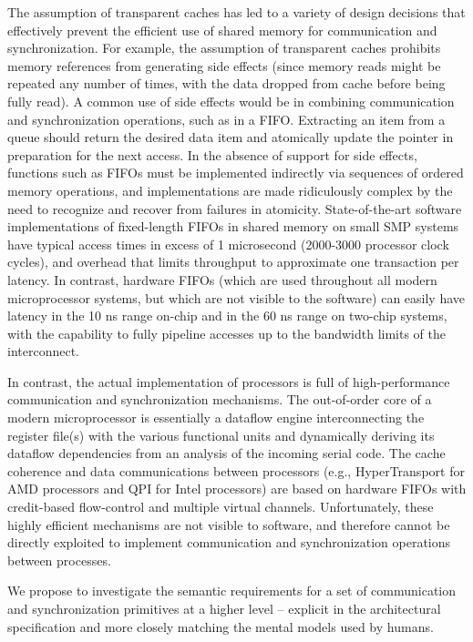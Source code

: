 The assumption of transparent caches has led to a variety of design decisions
that effectively prevent the efficient use of shared memory for communication and
synchronization.  For example, the assumption of transparent caches prohibits
memory references from generating side effects (since memory reads might be
repeated any number of times, with the data dropped from cache before being
fully read).  A common use of side effects would be in combining communication
and synchronization operations, such as in a FIFO.   Extracting an item from a 
queue should return the desired data item and atomically update the pointer
in preparation for the next access.  In the absence of support for side effects, 
functions such as FIFOs must be implemented indirectly via sequences of 
ordered memory operations, and implementations are made ridiculously 
complex by the need to recognize and recover from failures in atomicity.
State-of-the-art software implementations of fixed-length FIFOs in shared 
memory on small SMP systems have typical access times in excess of 
1 microsecond (2000-3000 processor clock cycles), and overhead that limits
throughput to approximate one transaction per latency.  In contrast, hardware
FIFOs (which are used throughout all modern microprocessor systems, but
which are not visible to the software) can easily have latency in the 10 ns 
range on-chip and in the 60 ns range on two-chip systems, with the capability
to fully pipeline accesses up to the bandwidth limits of the interconnect.

     In contrast, the actual implementation of processors is full of
     high-performance communication and synchronization mechanisms.
     The out-of-order core of a modern microprocessor is essentially a
     dataflow engine interconnecting the register file(s) with the
     various functional units and dynamically deriving its dataflow
     dependencies from an analysis of the incoming serial code.  The
     cache coherence and data communications between processors (e.g.,
     HyperTransport for AMD processors and QPI for Intel processors)
     are based on hardware FIFOs with credit-based flow-control and
     multiple virtual channels.  Unfortunately, these highly efficient
     mechanisms are not visible to software, and therefore cannot be
     directly exploited to implement communication and synchronization
     operations between processes.
     
     We propose to investigate the semantic requirements for a set of
     communication and synchronization primitives at a higher level --
     explicit in the architectural specification and more closely
     matching the mental models used by humans.
     
